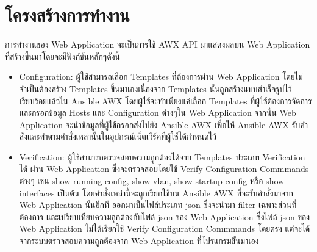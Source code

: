 \section{โครงสร้างการทำงาน}
\hspace{0.5in} การทำงานของ Web Application จะเป็นการใช้ AWX API มาแสดงผลบน Web Application ที่สร้างขึ้นมาโดยจะมีฟังก์ชันหลักๆดังนี้
\begin{itemize}
  \item Configuration: ผู้ใช้สามารถเลือก Templates ที่ต้องการผ่าน Web Application โดยไม่จำเป็นต้องสร้าง Templates ขึ้นมาเองเนื่องจาก Templates นั้นถูกสร้างแบบสำเร็จรูปไว้เรียบร้อยแล้วใน Ansible AWX โดยผู้ใช้จะทำเพียงแค่เลือก Templates ที่ผู้ใช้ต้องการจัดการและกรอกข้อมูล Hosts และ Configuration ต่างๆใน Web Application จากนั้น Web Application จะนำข้อมูลที่ผู้ใช้กรอกส่งไปยัง Ansible AWX เพื่อให้ Ansible AWX รับคำสั่งและทำตามคำสั่งเหล่านั้นในอุปกรณ์เน็ตเวิร์คที่ผู้ใช้ได้กำหนดไว้
  \item Verification: ผู้ใช้สามารถตรวจสอบความถูกต้องได้จาก Templates ประเภท Verification ได้ ผ่าน Web Application ซึ่งจะตรวจสอบโดยใช้ Verify Configuration Commmands ต่างๆ เช่น show running-config, show vlan, show startup-config หรือ show interfaces เป็นต้น โดยคำสั่งเหล่านี้จะถูกเรียกใช้บน Ansible AWX ที่จะรับคำสั่งมาจาก Web Application นั้นอีกที ออกมาเป็นไฟล์ประเภท json ซึ่งจะนำมา filter เฉพาะส่วนที่ต้องการ และเปรียบเทียบความถูกต้องกับไฟล์ json ของ Web Application ซึ่งไฟล์ json ของ Web Application ไม่ได้เรียกใช้ Verify Configuration Commmands โดยตรง แต่จะได้จากระบบตรวจสอบความถูกต้องจาก Web Application ที่โปรแกรมขึั้นมาเอง
\end{itemize}